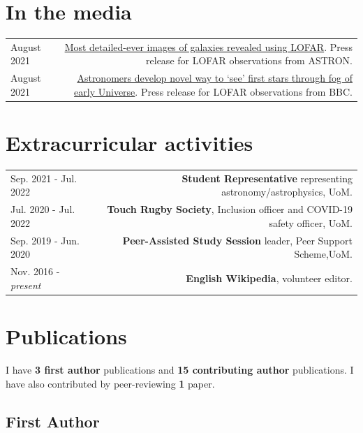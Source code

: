 \documentclass{article}
\begin{document}
\section*{In the media}

\begin{longtable}{L!{\vrule}R}
	
    August 2021 & \href{https://www.astron.nl/most-detailed-ever-images-of-galaxies-revealed-using-lofar }{Most detailed-ever images of galaxies revealed using LOFAR}. Press release for LOFAR observations from ASTRON. \\
	
    August 2021 & \href{https://www.bbc.co.uk/news/science-environment-57998940}{Astronomers develop novel way to `see' first stars through fog of early Universe}. Press release for LOFAR observations from BBC. \\

\end{longtable}

\section*{Extracurricular activities}
\begin{longtable}{L!{\vrule}R}

    Sep. 2021 - Jul. 2022 & \textbf{Student Representative} representing astronomy/astrophysics, UoM. \\

    Jul. 2020 - Jul. 2022 & \textbf{Touch Rugby Society}, Inclusion officer and COVID-19 safety officer, UoM. \\

    Sep. 2019 - Jun. 2020 & \textbf{Peer-Assisted Study Session} leader, Peer Support Scheme,UoM. \\
    Nov. 2016 - \textit{present} & \textbf{English Wikipedia}, volunteer editor. \\

\end{longtable}


\section*{Publications}

I have \textbf{3 first author} publications and \textbf{15 contributing author} publications. I have also contributed by peer-reviewing \textbf{1} paper.

\subsection*{First Author}
\end{document}
